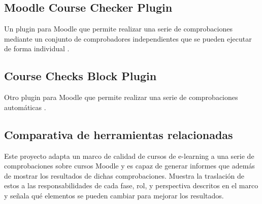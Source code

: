 \subsection{Moodle Course Checker Plugin}
Un plugin para Moodle que permite realizar una serie de comprobaciones mediante un conjunto de comprobadores independientes que se pueden ejecutar de forma individual \cite{coursechecker-2021}.

\subsection{Course Checks Block Plugin}
Otro plugin para Moodle que permite realizar una serie de comprobaciones automáticas \cite{coursechecksblock-2018}.

\subsection{Comparativa de herramientas relacionadas}
Este proyecto adapta un marco de calidad de cursos de e-learning a una serie de comprobaciones sobre cursos Moodle y es capaz de generar informes que además de mostrar los resultados de dichas comprobaciones. Muestra la traslación de estos a las responsabilidades de cada fase, rol, y perspectiva descritos en el marco y señala qué elementos se pueden cambiar para mejorar los resultados.

